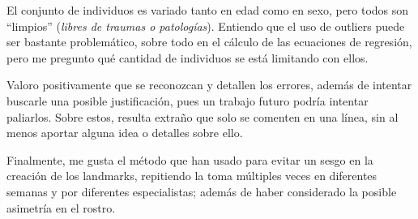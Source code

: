 \documentclass[13pt,a4paper]{article}
\begin{document}
El conjunto de individuos es variado tanto en edad como en sexo, pero todos son ``limpios'' (\textit{libres de traumas o patologías}). Entiendo que el uso de outliers puede ser bastante problemático, sobre todo en el cálculo de las ecuaciones de regresión, pero me pregunto qué cantidad de individuos se está limitando con ellos.

\vspace{\baselineskip}

Valoro positivamente que se reconozcan y detallen los errores, además de intentar buscarle una posible justificación, pues un trabajo futuro podría intentar paliarlos.
Sobre estos, resulta extraño que solo se comenten en una línea, sin al menos aportar alguna idea o detalles sobre ello.

\vspace{\baselineskip}

Finalmente, me gusta el método que han usado para evitar un sesgo en la creación de los landmarks, repitiendo la toma múltiples veces en diferentes semanas y por diferentes especialistas; además de haber considerado la posible asimetría en el rostro.


    \setlength{\parskip}{1em}
    \newpage
\end{document}
